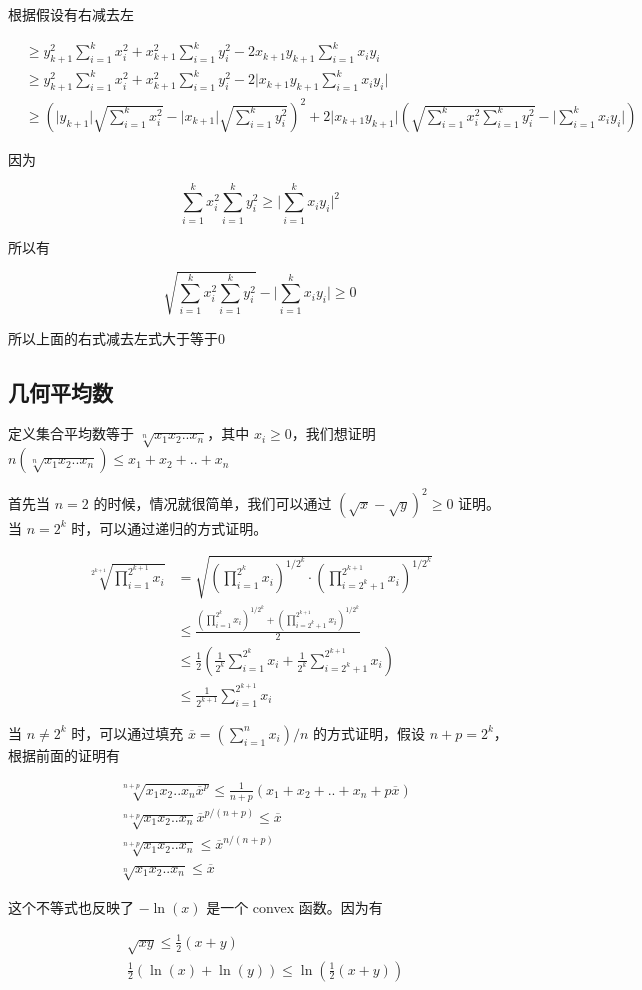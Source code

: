 根据假设有右减去左

\begin{align*}
    & \ge y_{k+1}^2\sum_{i=1}^{k}x_i^2 + x_{k+1}^2\sum_{i=1}^{k}y_i^2 - 2x_{k+1}y_{k+1}\sum_{i=1}^{k} x_i y_i \\
    & \ge y_{k+1}^2\sum_{i=1}^{k}x_i^2 + x_{k+1}^2\sum_{i=1}^{k}y_i^2 - 2 \lvert x_{k+1}y_{k+1}\sum_{i=1}^{k} x_i y_i \rvert \\
    & \ge ( \lvert y_{k+1} \rvert \sqrt{\sum_{i=1}^{k}x_i^2} -  \lvert x_{k+1} \rvert\sqrt{\sum_{i=1}^{k}y_i^2})^2 + 2 \lvert x_{k+1}y_{k+1} \rvert(\sqrt{\sum_{i=1}^{k}x_i^2 \sum_{i=1}^{k}y_i^2}- \lvert \sum_{i=1}^{k}x_iy_i \rvert)
\end{align*}

因为

\[
\sum_{i=1}^{k}x_i^2 \sum_{i=1}^{k}y_i^2 \ge \lvert \sum_{i=1}^{k}x_iy_i \rvert^2
\]

所以有

\[
\sqrt{\sum_{i=1}^{k}x_i^2 \sum_{i=1}^{k}y_i^2}- \lvert \sum_{i=1}^{k}x_iy_i \rvert \ge 0
\]

所以上面的右式减去左式大于等于0

\subsection{几何平均数}

定义集合平均数等于 $\sqrt[n]{x_1x_2..x_n}$，其中 $x_i \ge 0$，我们想证明 $n(\sqrt[n]{x_1x_2..x_n}) \le x_1 + x_2 + .. + x_n$

首先当 $n=2$ 的时候，情况就很简单，我们可以通过 $(\sqrt{x} - \sqrt{y})^2 \ge 0$ 证明。当 $n=2^k$ 时，可以通过递归的方式证明。

\begin{align*}
    \sqrt[2^{k+1}]{\prod_{i=1}^{2^{k+1}}x_i} &=  \sqrt{(\prod_{i=1}^{2^{k}}x_i)^{1/2^k} \cdot (\prod_{i=2^{k} +1}^{2^{k+1}}x_i) ^{1/2^k}}    \\
    & \le \frac{(\prod_{i=1}^{2^{k}}x_i) ^{1/2^k} + (\prod_{i=2^{k} +1}^{2^{k+1}}x_i) ^{1/2^k}}{2} \\
    & \le \frac{1}{2}(\frac{1}{2^k}\sum_{i=1}^{2^k}x_i + \frac{1}{2^k}\sum_{i=2^k+1}^{2^{k+1}}x_i) \\
    & \le \frac{1}{2^{k+1}}\sum_{i=1}^{2^{k+1}}x_i
\end{align*}

当 $n \ne 2^k$ 时，可以通过填充 $\overline{x} = (\sum_{i=1}^{n}x_i)/n$ 的方式证明，假设 $n + p = 2^k$，根据前面的证明有

\begin{align*}
    & \sqrt[n+p]{x_1x_2..x_n\overline{x}^p} \le \frac{1}{n+p}(x_1+x_2 + .. + x_n + p\overline{x}) \\
    & \sqrt[n+p]{x_1x_2..x_n} \overline{x}^{p/(n+p)} \le \overline{x} \\
    & \sqrt[n+p]{x_1x_2..x_n} \le \overline{x}^{n/(n+p)} \\
    & \sqrt[n]{x_1x_2..x_n} \le \overline{x}
\end{align*}

这个不等式也反映了 $-\ln(x)$ 是一个 convex 函数。因为有

\begin{align*}
    & \sqrt{xy} \le \frac{1}{2}(x+y) \\
    & \frac{1}{2}(\ln(x) + \ln(y)) \le \ln(\frac{1}{2}(x+y))
\end{align*}

